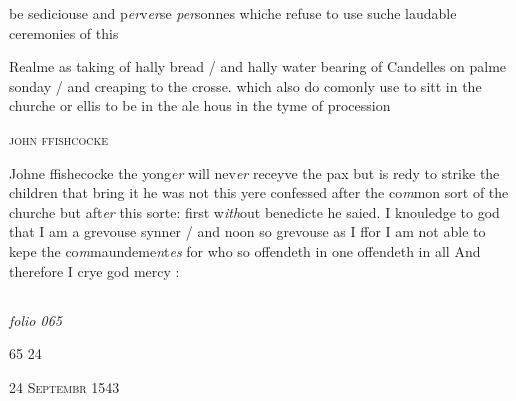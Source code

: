 \documentclass[12pt, a4paper]{book}
\begin{document}
		\ifthenelse{\isodd{\thepage}}
		{\reversemarginpar}
		{\normalmarginpar}
		be sediciouse and p\textit{er}v\textit{er}se \textit{per}sonnes whiche refuse to use suche laudable ceremonies of this
               	
 
		\ifthenelse{\isodd{\thepage}}
		{\reversemarginpar}
		{\normalmarginpar}
		Realme as taking of hally bread / and hally water
 bearing of Candelles on palme sonday / and
 creaping to the crosse. which also do comonly use
 to sitt in the churche or ellis to be in the ale hous
 in the tyme of procession
 

               
               	
				\begin{center}  {\scshape john ffishcocke}  \end{center}
			
               	
               		
		\ifthenelse{\isodd{\thepage}}
		{\reversemarginpar}
		{\normalmarginpar}
		Johne ffishecocke the yong\textit{er} will nev\textit{er} receyve the pax
 but is redy to strike the children that bring it
 he was not this yere confessed after the co\textit{m}mon sort
 of the churche but aft\textit{er} this sorte: first w\textit{ith}out
 benedicte he saied. I knouledge to god that I
 am a grevouse synner / and noon so grevouse as I
 ffor I am not able to kepe the co\textit{m}maundeme\textit{n}t\textit{es}
 for who so offendeth in one offendeth in all
 And therefore I crye god mercy :


            
            
\dotfill
						\newpage {} \subsection*{}

\textit{folio 065}


\begin{flushright}{\color{Mahogany}65} 24\end{flushright} 

               
				\begin{center} \begin{large} {\scshape 
                  24 Septembr 1543
               } \end{large} \end{center}
			
               
               	
\end{document}
